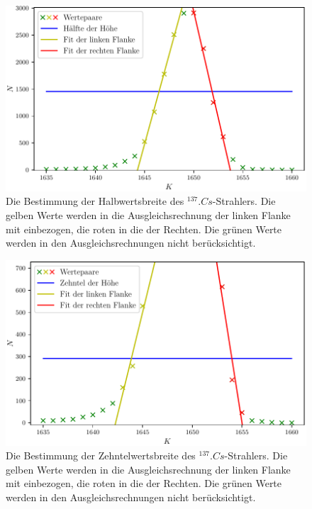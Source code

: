 \begin{figure}
	\centering
	\includegraphics[width=\linewidth-70pt,height=\textheight-70pt,keepaspectratio]{content/images/Cs137Halb.pdf}
	\caption{Die Bestimmung der Halbwertsbreite des $^{137}.{Cs}$-Strahlers. Die gelben Werte werden in die Ausgleichsrechnung der linken Flanke mit einbezogen, die roten in die der Rechten. Die grünen Werte werden in den Ausgleichsrechnungen nicht berücksichtigt.}
	\label{fig:2tel}
\end{figure}

\begin{figure}
	\centering
	\includegraphics[width=\linewidth-70pt,height=\textheight-70pt,keepaspectratio]{content/images/Cs137Zehntel.pdf}
	\caption{Die Bestimmung der Zehntelwertsbreite des $^{137}.{Cs}$-Strahlers. Die gelben Werte werden in die Ausgleichsrechnung der linken Flanke mit einbezogen, die roten in die der Rechten. Die grünen Werte werden in den Ausgleichsrechnungen nicht berücksichtigt.}
	\label{fig:10tel}
\end{figure}

